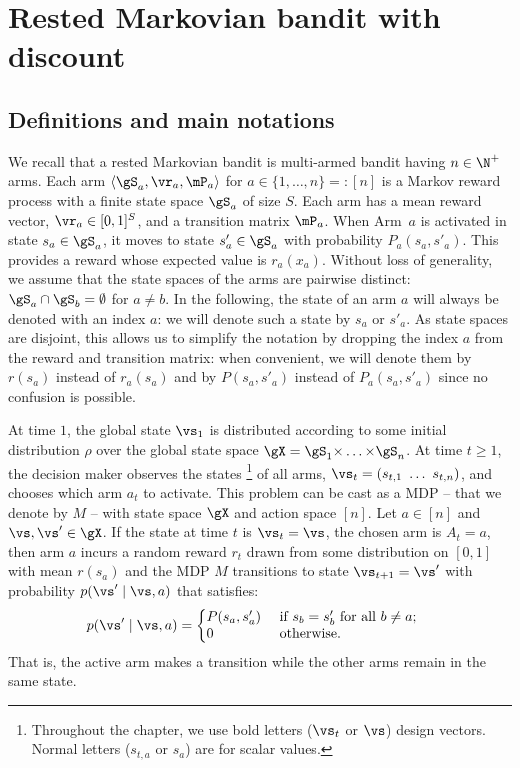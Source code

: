 \section{Rested Markovian bandit with discount}
\label{sec:bandits}


\subsection{Definitions and main notations}
\label{ssec:def}

We recall that a rested Markovian bandit is multi-armed bandit having $n\in\N^+$ arms. Each arm $\langle\gS_a,\vr_a,\mP_a\rangle$ for $a\in\{1,\dots, n\}=:[n]$ is a Markov
reward process with a finite state space $\gS_a$ of size $S$. Each arm has
a mean reward vector, $\vr_a\in[0,1]^S$, and a transition matrix
$\mP_a$. When Arm~$a$ is activated in state $s_a\in\gS_a$, it moves to
state $s'_a\in\gS_a$ with probability $P_a(s_a,s'_a)$. This provides a reward
whose expected value is $r_a(x_a)$. Without loss of generality, we assume
that the state spaces of the arms are pairwise distinct:
$\gS_a\cap\gS_b=\emptyset$ for $a\ne b$.  In the following, the state of an
arm $a$ will always be denoted with an index $a$: we will denote such a
state by $s_a$ or $s'_a$. As state spaces are disjoint, this allows us to
simplify the notation by dropping the index $a$ from the reward and transition
matrix: when convenient, we will denote them by $r(s_a)$ instead of $r_a(s_a)$
and by $P(s_a,s'_a)$ instead of $P_a(s_a,s'_a)$ since no confusion is possible. 

At time $1$, the global  state $\vs_1$ is distributed according to some initial
distribution $\rho$ over the global state space $\gX =
\gS_1{\times}\dots{\times}\gS_n$. At time $t\ge 1$, the decision maker observes
the states
\footnote{Throughout the chapter, we use bold letters ($\vs_t$ or $\vs$) design vectors. Normal letters
($s_{t,a}$ or $s_a$) are for scalar values.} of all arms,
$\vs_t=(s_{t,1}\ \dots\ s_{t,n})$, and chooses which arm $a_t$ to activate.
This problem can be cast as a MDP -- that we denote by $M$ -- with state
space $\gX$ and action space \([n]\). Let $a\in[n]$ and $\vs,\vs'\in\gX$. If the state at time $t$ is $\vs_t=\vs$, the chosen arm is $A_t=a$, then arm $a$ incurs a random reward $r_t$ drawn from some distribution on \([0,1]\) with
mean \(r(s_a)\) and the MDP $M$ transitions to state $\vs_{t+1}=\vs'$ with probability \(p(\vs'\mid \vs,a)\) that satisfies:
\begin{align}
    \label{eq:defP}
    p(\vs' \mid \vs,a) 
    &= 
    \left\{
        \begin{array}{@{}ll@{}}
            P(s_a,s'_a) & \text{ if $s_{b}=s'_{b}$ for all $b\ne a$;}\\
            0 &\text{ otherwise}.
        \end{array}
    \right.
\end{align}
That is, the active arm makes a transition while the other arms remain in
the same state.

